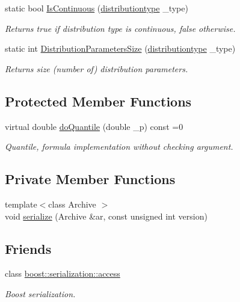 \begin{DoxyCompactItemize}
static bool \hyperlink{class_c_random_variable_a93c630ed87ce5707a162d6ee6fcd3e01}{Is\-Continuous} (\hyperlink{class_c_random_variable_a80d2a87c43847274138b51f7d713d7f1}{distributiontype} \-\_\-type)
\begin{DoxyCompactList}\small\item\em Returns true if distribution type is continuous, false otherwise. \end{DoxyCompactList}\item 
static int \hyperlink{class_c_random_variable_a93c2c6979eac79a19933b7c3ee5faa88}{Distribution\-Parameters\-Size} (\hyperlink{class_c_random_variable_a80d2a87c43847274138b51f7d713d7f1}{distributiontype} \-\_\-type)
\begin{DoxyCompactList}\small\item\em Returns size (number of) distribution parameters. \end{DoxyCompactList}\end{DoxyCompactItemize}
\subsection*{Protected Member Functions}
\begin{DoxyCompactItemize}
\item 
virtual double \hyperlink{class_c_random_variable_a552ab36c8144d7154cbe3cd363eee65b}{do\-Quantile} (double \-\_\-p) const =0
\begin{DoxyCompactList}\small\item\em Quantile, formula implementation without checking argument. \end{DoxyCompactList}\end{DoxyCompactItemize}
\subsection*{Private Member Functions}
\begin{DoxyCompactItemize}
\item 
{\footnotesize template$<$class Archive $>$ }\\void \hyperlink{class_c_random_variable_a0f2d207faede9d8e4cbd48823009435d}{serialize} (Archive \&ar, const unsigned int version)
\end{DoxyCompactItemize}
\subsection*{Friends}
\begin{DoxyCompactItemize}
\item 
class \hyperlink{class_c_random_variable_ac98d07dd8f7b70e16ccb9a01abf56b9c}{boost\-::serialization\-::access}
\begin{DoxyCompactList}\small\item\em Boost serialization. \end{DoxyCompactList}\end{DoxyCompactItemize}


